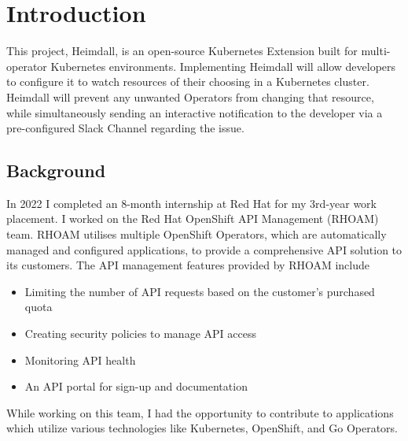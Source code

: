 \documentclass{article}
\begin{document}
\newpage
\section{Introduction}
This project, Heimdall, is an open-source Kubernetes Extension built for multi-operator Kubernetes environments. Implementing Heimdall will allow developers to configure it to watch resources of their choosing in a Kubernetes cluster. Heimdall will prevent any unwanted Operators from changing that resource, while simultaneously sending an interactive notification to the developer via a pre-configured Slack Channel regarding the issue. 



\subsection{Background}
In 2022 I completed an 8-month internship at Red Hat for my 3rd-year work placement. I worked on the Red Hat OpenShift API Management (RHOAM) team. RHOAM utilises multiple OpenShift Operators, which are automatically managed and configured applications, to provide a comprehensive API solution to its customers. The API management features provided by RHOAM include \cite{rhoam-overview}
\begin{itemize}
    \itemsep0em 
    \item Limiting the number of API requests based on the customer’s purchased quota
    \item Creating security policies to manage API access
    \item Monitoring API health
    \item An API portal for sign-up and documentation
\end{itemize}
While working on this team, I had the opportunity to contribute to applications which utilize various technologies like Kubernetes, OpenShift, and Go Operators.
\end{document}

